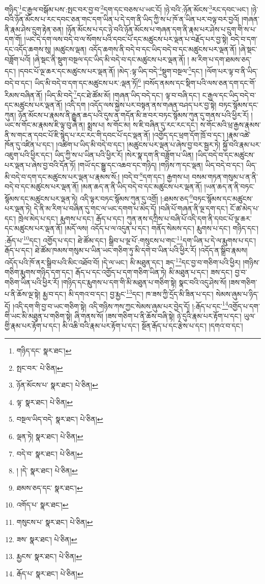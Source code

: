 གཉིད་\footnote{གཉིད་དང་  སྣར་ཐང་། }ང་རྒྱལ་བསྒོམ་པས་:སྤང་བར་བྱ་བ་\footnote{སྤང་བར་  པེ་ཅིན། }དག་དང་བཅས་པ་ཡང་ངོ། །ཉེ་བའི་:ཉོན་མོངས་\footnote{ཉོན་མོངས་པ་  སྣར་ཐང་།  པེ་ཅིན། }རང་དབང་ཡང་། །ཉེ་བའི་ཉོན་མོངས་པ་རང་དབང་ཅན་གང་དག་ཡིན་པ་དེ་དག་ནི་ཡིད་ཀྱི་ས་པ་ཁོ་ན་ཡིན་པར་བལྟ་བར་བྱའོ། །གཞན་ནི་རྣམ་ཤེས་དྲུག་རྟེན་ཅན། །ཉོན་མོངས་པ་དང་ཉེ་བའི་ཉོན་མོངས་པ་གཞན་དག་ནི་རྣམ་པར་ཤེས་པ་དྲུག་གི་ས་པ་དག་གོ། །ཡང་དེ་དག་ལས་བདེ་བ་ལ་སོགས་པའི་དབང་པོ་དང་མཚུངས་པར་ལྡན་པ་བརྗོད་པར་བྱ་སྟེ། བདེ་བ་དག་དང་འདོད་ཆགས་སུ། །མཚུངས་ལྡན། འདོད་ཆགས་ནི་བདེ་བ་དང་ཡིད་བདེ་བ་དང་མཚུངས་པར་ལྡན་ནོ། །ཞེ་སྡང་བཟློག་པའོ། །ཞེ་སྡང་ནི་སྡུག་བསྔལ་དང་ཡིད་མི་བདེ་བ་དང་མཚུངས་པར་ལྡན་ནོ། །
མ་རིག་པ་དག་ཐམས་ཅད་དང་། །དབང་པོ་ལྔ་ཆར་དང་མཚུངས་པར་ལྡན་ནོ། །མེད་:ལྟ་ཡིད་བདེ་\footnote{ལྟ་  སྣར་ཐང་།  པེ་ཅིན། }སྡུག་བསྔལ་\footnote{བསྔལ་ཡིད་བདེ་  སྣར་ཐང་།  པེ་ཅིན། }དང་། །ལོག་པར་ལྟ་བ་ནི་ཡིད་བདེ་བ་དང་། ཡིད་མི་བདེ་བ་དག་དང་མཚུངས་པར་:ལྡན་ཏོ།\footnote{ལྡན་ཏེ།  སྣར་ཐང་།  པེ་ཅིན། } །བསོད་ནམས་དང་སྡིག་པའི་ལས་ཅན་དག་དང་གོ་རིམས་བཞིན་ནོ། །ཡིད་མི་བདེ་\footnote{བདེ་བ་  སྣར་ཐང་།  པེ་ཅིན། }དང་ཐེ་ཚོམ་མོ། །གཞན་ཡིད་བདེ་དང་། ལྟ་བ་བཞི་དང་། ང་རྒྱལ་དང་ཡིད་བདེ་བ་དང་མཚུངས་པར་ལྡན་ནོ། །འདི་དག །འདོད་ལས་སྐྱེས་པར་བསྟན་ནས་གཞན་བཤད་པར་བྱ་སྟེ། བཏང་སྙོམས་དང་ཀུན། ཉོན་མོངས་པ་རྣམས་ནི་རྒྱུན་ཆད་པའི་དུས་ན་གདོན་མི་ཟ་བར་བཏང་སྙོམས་ཀུན་དུ་གནས་པའི་ཕྱིར་རོ། །ཡང་ས་གོང་མ་རྣམས་ཇི་ལྟ་བུ་ཞེ་ན། སྨྲས་པ། ས་གོང་མ། ས་ཇི་བཞིན་དུ་རང་རང་དང་། ས་གོང་མའི་ཕྲ་རྒྱས་རྣམས་ནི་ས་གང་ན་དབང་པོ་ཇི་སྙེད་པ་རང་རང་གི་དབང་པོ་དང་ལྡན་ནོ། །འགྱོད་དང་ཕྲག་དོག་ཁྲོ་བ་དང་། །རྣམ་འཚེ་ཁོན་དུ་འཛིན་པ་དང་། །འཚིག་པ་ཡིད་མི་བདེ་བ་དང་། །མཚུངས་པར་ལྡན་པ་ཞེས་བྱ་བར་སྦྱར་ཏེ། སྐྱོ་བའི་རྣམ་པར་འཇུག་པའི་ཕྱིར་དང་། ཡིད་ཀྱི་ས་པ་ཡིན་པའི་ཕྱིར་རོ། །སེར་སྣ་དག་ནི་བཟློག་པ་ཡིན། །ཡིད་བདེ་བ་དང་མཚུངས་པར་ལྡན་པ་ཞེས་བྱ་བའི་དོན་ཏོ། །གཡོ་དང་སྒྱུ་དང་འཆབ་དང་གཉིད། །གཉིས་ཀ་དང་ལྡན། ཡིད་བདེ་བ་དང་། ཡིད་མི་བདེ་བ་དག་དང་མཚུངས་པར་ལྡན་པ་རྣམས་སོ:། །བདེ་བ་\footnote{། །དེ་  སྣར་ཐང་།  པེ་ཅིན། }དག་དང་། རྒྱགས་པ། བསམ་གཏན་གསུམ་པ་ན་ནི་བདེ་བ་དང་མཚུངས་པར་ལྡན་ནོ། །མན་ཆད་ན་ནི་ཡིད་བདེ་བ་དང་མཚུངས་པར་ལྡན་ནོ། །ཡན་ཆད་ན་ནི་བཏང་སྙོམས་དང་མཚུངས་པར་ལྡན་ཏེ། འདི་ལྟར་བཏང་སྙོམས་ཀུན་དུ་འགྲོ། །:ཐམས་ཅད་\footnote{ཐམས་ཅད་དང་  སྣར་ཐང་། }བཏང་སྙོམས་དང་མཚུངས་པར་ལྡན་ཏེ། དེ་ནི་མ་རིག་པ་བཞིན་དུ་གང་ལ་ཡང་དགག་པ་མེད་དོ། །བཞི་པོ་གཞན་ནི་ལྔ་དག་དང་། ངོ་ཚ་མེད་པ་དང་། ཁྲེལ་མེད་པ་དང་། རྨུགས་པ་དང་། རྒོད་པ་དང་། ཀུན་ནས་དཀྲིས་པ་བཞི་པོ་འདི་དག་ནི་དབང་པོ་ལྔ་ཆར་དང་མཚུངས་པར་ལྡན་ནོ། །མདོ་ལས། འདོད་པ་ལ་འདུན་པ་དང་། གནོད་སེམས་དང་། རྨུགས་པ་དང་། གཉིད་དང་། :རྒོད་པ་\footnote{འགོད་པ་  སྣར་ཐང་། }དང་། འགྱོད་པ་དང་། ཐེ་ཚོམ་དང་། སྒྲིབ་པ་ལྔ་པོ་:གསུངས་པ་གང་\footnote{གསུངས་པ་  སྣར་ཐང་།  པེ་ཅིན། }དག་ཡིན་པ་དེ་ལ་རྨུགས་པ་དང་། རྒོད་པ་དང་། ཐེ་ཚོམ་ཁམས་གསུམ་པ་ཡིན་ཡང་གཅིག་ཏུ་མི་དགེ་བ་ཡིན་པའི་ཕྱིར་རོ། །འདོད་ན་སྒྲིབ་རྣམས། འདོད་པའི་ཁོ་ནར་སྒྲིབ་པའི་མིང་འཐོབ་བོ། །དེ་ལ་ཡང་། མི་མཐུན་དང་། ཟད་\footnote{ཟས་  སྣར་ཐང་།  པེ་ཅིན། }དང་བྱ་བ་གཅིག་པའི་ཕྱིར། །གཉིས་གཅིག་རྨུགས་གཉིད་དག་དང་། རྒོད་པ་དང་འགྱོད་པ་དག་གཅིག་ཡིན་ཏེ། མི་མཐུན་པ་དང་། ཟས་དང་། བྱ་བ་གཅིག་ཡིན་པའི་ཕྱིར་རོ། །གཉིད་དང་རྨུགས་པ་དག་གི་མི་མཐུན་པ་གཅིག་སྟེ། སྣང་བའི་འདུ་ཤེས་སོ། །ཟས་གཅིག་པ་ནི་ཆོས་ལྔ་སྟེ། རྨྱ་བ་དང་། མི་དགའ་བ་དང་། བྱ་རྨྱང་\footnote{རྨྱངས་  སྣར་ཐང་།  པེ་ཅིན། }དང་། ཁ་ཟས་ཀྱི་དྲོད་མི་ཟིན་པ་དང་། སེམས་ཞུམ་པ་ཉིད་དོ། །འདི་དག་གི་བྱ་བ་ཡང་གཅིག་སྟེ། འདི་གཉིས་ཀས་ཀྱང་སེམས་ཞུམ་པར་བྱེད་དོ། །:རྒོད་པ་དང་\footnote{རྒོད་པ་  སྣར་ཐང་།  པེ་ཅིན། }འགྱོད་པ་དག་གི་ཡང་མི་མཐུན་པ་གཅིག་སྟེ། ཞི་གནས་སོ། །ཟས་གཅིག་པ་ནི་ཆོས་བཞི་སྟེ། ཉེ་དུའི་རྣམ་པར་རྟོག་པ་དང་། ཡུལ་གྱི་རྣམ་པར་རྟོག་པ་དང་། མི་འཆི་བའི་རྣམ་པར་རྟོག་པ་དང་། སྔོན་རྒོད་པ་དང་རྩེས་པ་དང་། །དགའ་བ་དང་། 